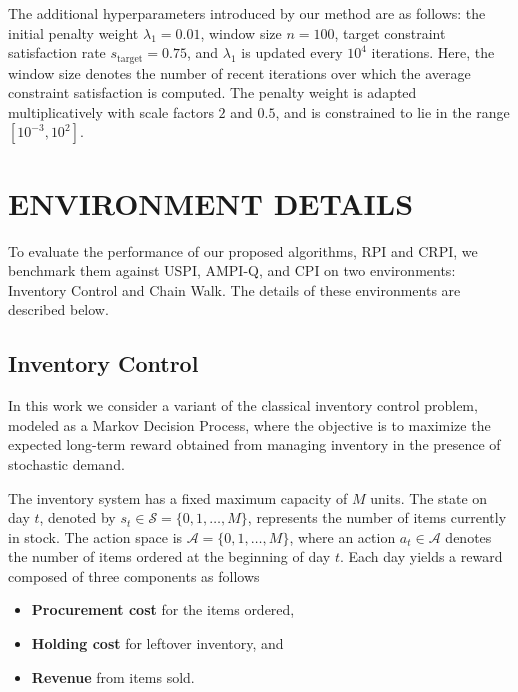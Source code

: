 \documentclass[twoside]{article}
\theoremstyle{plain}
\theoremstyle{definition}
\theoremstyle{remark}
\begin{document}
The additional hyperparameters introduced by our method are as follows: the initial penalty weight $\lambda_1 = 0.01$, window size $n = 100$, target constraint satisfaction rate $s_\text{target}=0.75$, and $\lambda_1$ is updated every $10^4$ iterations. 
Here, the window size denotes the number of recent iterations over which the average constraint satisfaction is computed. 
The penalty weight is adapted multiplicatively with scale factors $2$ and $0.5$, and is constrained to lie in the range $[10^{-3}, 10^{2}]$.



\section{ENVIRONMENT DETAILS}
\label{sec:env_details}

To evaluate the performance of our proposed algorithms, RPI and CRPI, we benchmark them against USPI, AMPI-Q, and CPI on two environments: Inventory Control and Chain Walk. The details of these environments are described below.

\subsection{Inventory Control}
\label{app:inv_ctrl_mdp}

In this work we consider a variant of the classical inventory control problem, modeled as a Markov Decision Process, where the objective is to maximize the expected long-term reward obtained from managing inventory in the presence of stochastic demand.

The inventory system has a fixed maximum capacity of \( M \) units. The state on day \( t \), denoted by \( s_t \in \mathcal{S} = \{0, 1, \dots, M\} \), represents the number of items currently in stock. The action space is \( \mathcal{A} = \{0, 1, \dots, M\} \), where an action \( a_t \in \mathcal{A} \) denotes the number of items ordered at the beginning of day \( t \). Each day yields a reward composed of three components as follows
\begin{itemize}
    \item \textbf{Procurement cost} for the items ordered,
    \item \textbf{Holding cost} for leftover inventory, and
    \item \textbf{Revenue} from items sold.
\end{itemize}
\end{document}
